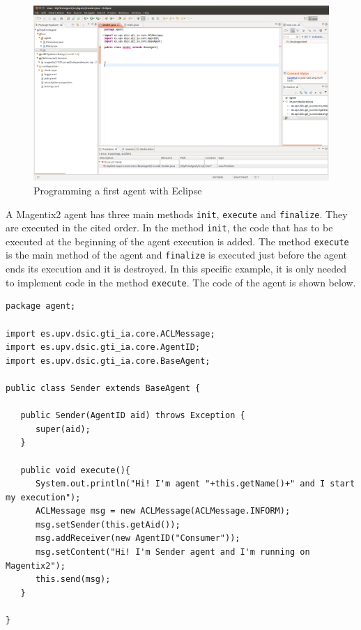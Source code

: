 \begin{figure}[!h]
\centering
\includegraphics[scale=0.25]{Quickstart/images/develop2}
\caption{Programming a first agent with Eclipse}
\label{img:develop2}
\end{figure}



A Magentix2 agent has three main methods \texttt{init}, \texttt{execute} and \texttt{finalize}. They are executed in the cited order. In the method \texttt{init}, the code that has to be executed at the beginning of the agent execution is added. The method \texttt{execute} is the main method of the agent and \texttt{finalize} is executed just before the agent ends its execution and it is destroyed. In this specific example, it is only needed to implement code in the method \texttt{execute}. The code of the agent is shown below.
\begin{lstlisting}[style=Java]
package agent;

import es.upv.dsic.gti_ia.core.ACLMessage;
import es.upv.dsic.gti_ia.core.AgentID;
import es.upv.dsic.gti_ia.core.BaseAgent;

public class Sender extends BaseAgent {

   public Sender(AgentID aid) throws Exception {
      super(aid);
   }

   public void execute(){
      System.out.println("Hi! I'm agent "+this.getName()+" and I start my execution");
      ACLMessage msg = new ACLMessage(ACLMessage.INFORM);
      msg.setSender(this.getAid());
      msg.addReceiver(new AgentID("Consumer"));
      msg.setContent("Hi! I'm Sender agent and I'm running on Magentix2");
      this.send(msg);
   }

}
\end{lstlisting}

